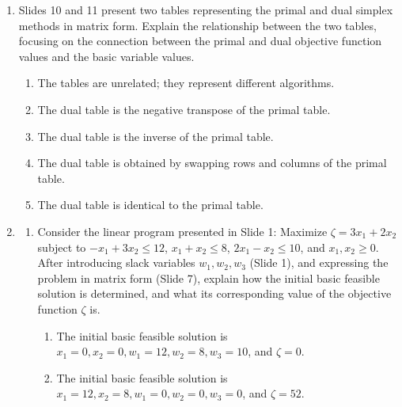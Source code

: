\documentclass{article}%
\begin{document}
\begin{enumerate}
\begin{enumerate}%
\item If any element of $\bar{C}$ is positive, the solution is optimal.%
\item If any element of $\bar{C}$ is zero, the solution is optimal.%
\item If all elements of $\bar{C}$ are non-negative, the solution is optimal.%
\item If all elements of $\bar{C}$ are negative, the solution is optimal.%
\item The vector $\bar{C}$ is irrelevant to optimality; only the value of $\bar{J}$ matters.%
\end{enumerate}%
\vspace{1em}%
\item Slides 10 and 11 present two tables representing the primal and dual simplex methods in matrix form.  Explain the relationship between the two tables, focusing on the connection between the primal and dual objective function values and the basic variable values.%
\begin{enumerate}%
\item The tables are unrelated; they represent different algorithms.%
\item The dual table is the negative transpose of the primal table.%
\item The dual table is the inverse of the primal table.%
\item The dual table is obtained by swapping rows and columns of the primal table.%
\item The dual table is identical to the primal table.%
\end{enumerate}%
\vspace{1em}%
\item%
\begin{enumerate}%
\item Consider the linear program presented in Slide 1: Maximize $ \zeta = 3x_1 + 2x_2 $ subject to $ -x_1 + 3x_2 \le 12 $, $ x_1 + x_2 \le 8 $, $ 2x_1 - x_2 \le 10 $, and $ x_1, x_2 \ge 0 $. After introducing slack variables $w_1, w_2, w_3$ (Slide 1), and expressing the problem in matrix form (Slide 7), explain how the initial basic feasible solution is determined, and what its corresponding value of the objective function $\zeta$ is.%
\begin{enumerate}%
\item The initial basic feasible solution is $x_1 = 0, x_2 = 0, w_1 = 12, w_2 = 8, w_3 = 10$, and $\zeta = 0$.%
\item The initial basic feasible solution is $x_1 = 12, x_2 = 8, w_1 = 0, w_2 = 0, w_3 = 0$, and $\zeta = 52$.%

\end{enumerate}
\end{enumerate}
\end{enumerate}
\end{document}
